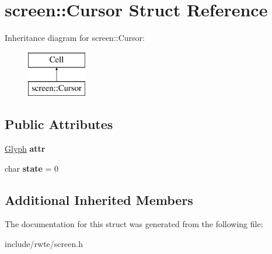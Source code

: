 \hypertarget{structscreen_1_1Cursor}{}\section{screen\+::Cursor Struct Reference}
\label{structscreen_1_1Cursor}
Inheritance diagram for screen\+::Cursor\+:\begin{figure}[H]
\begin{center}
\leavevmode
\includegraphics[height=2.000000cm]{structscreen_1_1Cursor}
\end{center}
\end{figure}
\subsection*{Public Attributes}
\begin{DoxyCompactItemize}
\item 
\mbox{\label{structscreen_1_1Cursor_a0145b4f92a32630072824a8b6b432cbc}} 
\mbox{\hyperlink{structscreen_1_1Glyph}{Glyph}} {\bfseries attr}
\item 
\mbox{\label{structscreen_1_1Cursor_a4f10fdc85430b03621e0de31c159aa4a}} 
char {\bfseries state} = 0
\end{DoxyCompactItemize}
\subsection*{Additional Inherited Members}


The documentation for this struct was generated from the following file\+:\begin{DoxyCompactItemize}
\item 
include/rwte/screen.\+h\end{DoxyCompactItemize}
